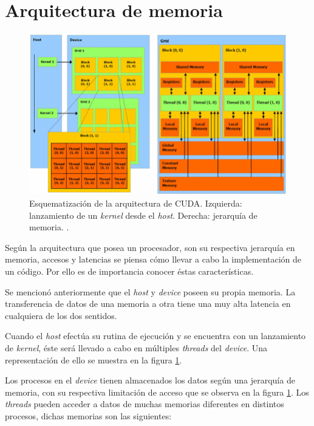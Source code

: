 \section{Arquitectura de memoria}

\begin{figure}[h!]
	\centering
	\includegraphics[width=\textwidth]{figs/cap3/Schematization-of-CUDA-architecture-Schematic-representation-of-CUDA-threads-and-memory.png}
	\caption{Esquematización de la arquitectura de CUDA. Izquierda: lanzamiento de un \textit{kernel} desde el \textit{host}. Derecha: jerarquía de memoria.  \cite{nobile2014cutauleaping}.}
	\label{fig:schedule_architecture_cuda}
\end{figure}

Según la arquitectura que posea un procesador, son su respectiva jerarquía en memoria, accesos y latencias se piensa cómo llevar a cabo la implementación de un código. Por ello es de importancia conocer éstas características. 

Se mencionó anteriormente que el \textit{host} y \textit{device} poseen su propia memoria. La transferencia de datos de una memoria a otra tiene una muy alta latencia en cualquiera de los dos sentidos. 


Cuando el \textit{host} efectúa su rutina de ejecución y se encuentra con un lanzamiento de \textit{kernel}, éste será llevado a cabo en múltiples \textit{threads} del \textit{device}. Una representación de ello se muestra en la figura \ref{fig:schedule_architecture_cuda}. 

Los procesos en el \textit{device} tienen almacenados los datos según una jerarquía de memoria, con su respectiva limitación de acceso que se observa en la figura \ref{fig:schedule_architecture_cuda}. Los \textit{threads} pueden acceder a datos de muchas memorias diferentes en distintos procesos, dichas memorias son las siguientes:

